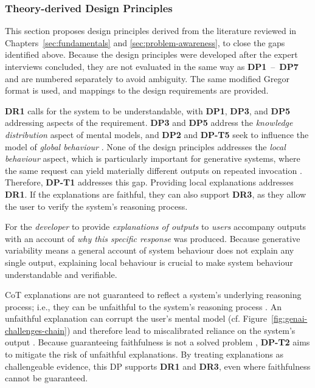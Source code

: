 \subsubsection{Theory-derived Design Principles} \label{sssec:theory-dp}

This section proposes design principles derived from the literature reviewed in Chapters~\ref{sec:fundamentals} and \ref{sec:problem-awareness}, to close the gaps identified above. Because the design principles were developed after the expert interviews concluded, they are not evaluated in the same way as \textbf{DP1}~--~\textbf{DP7} and are numbered separately to avoid ambiguity. The same modified Gregor format is used, and mappings to the design requirements are provided.

\textbf{DR1} calls for the system to be understandable, with \textbf{DP1}, \textbf{DP3}, and \textbf{DP5} addressing aspects of the requirement. \textbf{DP3} and \textbf{DP5} address the \textit{knowledge distribution} aspect of mental models, and \textbf{DP2} and \textbf{DP-T5} seek to influence the model of \textit{global behaviour} \parencite{Gero2020}. None of the design principles addresses the \textit{local behaviour} aspect, which is particularly important for generative systems, where the same request can yield materially different outputs on repeated invocation \parencite{Weisz2025}. Therefore, \textbf{DP-T1} addresses this gap. Providing local explanations addresses \textbf{DR1}. If the explanations are faithful, they can also support \textbf{DR3}, as they allow the user to verify the system's reasoning process.

    {For the \textit{developer} to provide \textit{explanations of outputs} to \textit{users}}
    {accompany outputs with an account of \textit{why this specific response} was produced.}
    {Because generative variability means a general account of system behaviour does not explain any single output, explaining local behaviour is crucial to make system behaviour understandable and verifiable.}

\ac{CoT} explanations are not guaranteed to reflect a system's underlying reasoning process; i.e., they can be unfaithful to the system’s reasoning process \parencite{Lyu2023}. An unfaithful explanation can corrupt the user's mental model (cf. Figure~\ref{fig:genai-challenges-chain}) and therefore lead to miscalibrated reliance on the system's output \parencite{Jussupow2021}. Because guaranteeing faithfulness is not a solved problem \parencite{Tutek2025}, \textbf{DP-T2} aims to mitigate the risk of unfaithful explanations. By treating explanations as challengeable evidence, this \ac{DP} supports \textbf{DR1} and \textbf{DR3}, even where faithfulness cannot be guaranteed.


